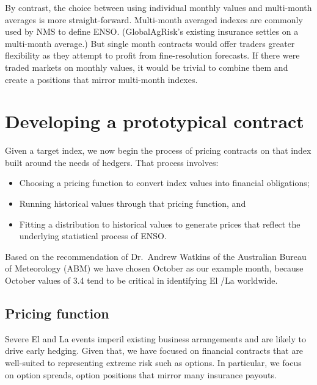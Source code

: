 \documentclass[article]{jss}
\begin{document}
By contrast, the choice between using individual monthly values and
multi-month averages is more straight-forward. Multi-month averaged
indexes are commonly used by NMS to define ENSO. (GlobalAgRisk's
existing insurance settles on a multi-month average.) But single month
contracts would offer traders greater flexibility as they attempt to
profit from fine-resolution forecasts. If there were traded markets on
monthly values, it would be trivial to combine them and create a
positions that mirror multi-month indexes.

\section{Developing a prototypical
contract}\label{developing-a-prototypical-contract}

Given a target index, we now begin the process of pricing contracts on
that index built around the needs of hedgers. That process involves:

\begin{itemize}
\itemsep1pt\parskip0pt
\item
  Choosing a pricing function to convert index values into financial
  obligations;
\item
  Running historical values through that pricing function, and
\item
  Fitting a distribution to historical values to generate prices that
  reflect the underlying statistical process of ENSO.
\end{itemize}

Based on the recommendation of Dr.~Andrew Watkins of the Australian
Bureau of Meteorology (ABM) we have chosen October as our example month,
because October values of  3.4 tend to be critical in
identifying El /La  worldwide.

\subsection{Pricing function}\label{pricing-function}

Severe El  and La  events imperil existing
business arrangements and are likely to drive early hedging. Given that,
we have focused on financial contracts that are well-suited to
representing extreme risk such as options. In particular, we focus on
option spreads, option positions that mirror many insurance payouts.
\end{document}
